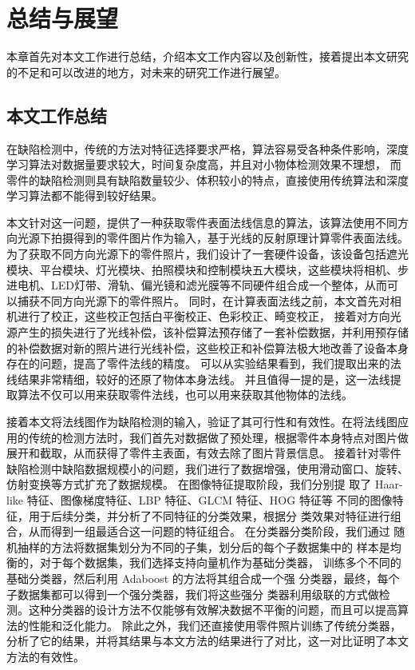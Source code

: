 
\chapter{总结与展望}

本章首先对本文工作进行总结，介绍本文工作内容以及创新性，接着提出本文研究的不足和可以改进的地方，对未来的研究工作进行展望。

\section{本文工作总结}

在缺陷检测中，传统的方法对特征选择要求严格，算法容易受各种条件影响，深度学习算法对数据量要求较大，时间复杂度高，并且对小物体检测效果不理想，
而零件的缺陷检测则具有缺陷数量较少、体积较小的特点，直接使用传统算法和深度学习算法都不能得到较好结果。

本文针对这一问题，提供了一种获取零件表面法线信息的算法，该算法使用不同方向光源下拍摄得到的零件图片作为输入，基于光线的反射原理计算零件表面法线。为了获取不同方向光源下的零件照片，我们设计了一套硬件设备，该设备包括遮光模块、平台模块、灯光模块、拍照模块和控制模块五大模块，这些模块将相机、步进电机、LED灯带、滑轨、偏光镜和滤光膜等不同硬件组合成一个整体，从而可以捕获不同方向光源下的零件照片。
同时，在计算表面法线之前，本文首先对相机进行了校正，这些校正包括白平衡校正、色彩校正、畸变校正，
接着对方向光源产生的损失进行了光线补偿，该补偿算法预存储了一套补偿数据，并利用预存储的补偿数据对新的照片进行光线补偿，这些校正和补偿算法极大地改善了设备本身存在的问题，提高了零件法线的精度。
可以从实验结果看到，我们提取出来的法线结果非常精细，较好的还原了物体本身法线。
并且值得一提的是，这一法线提取算法不仅可以用来获取零件法线，也可以用来获取其他物体的法线。

接着本文将法线图作为缺陷检测的输入，验证了其可行性和有效性。在将法线图应用的传统的检测方法时，我们首先对数据做了预处理，根据零件本身特点对图片做展开和截取，从而获得了零件主表面，有效去除了图片背景信息。
接着针对零件缺陷检测中缺陷数据规模小的问题，我们进行了数据增强，使用滑动窗口、旋转、仿射变换等方式扩充了数据规模。
在图像特征提取阶段，我们分别提
取了 Haar-like 特征、图像梯度特征、LBP 特征、GLCM 特征、HOG 特征等
不同的图像特征，用于后续分类，并分析了不同特征的分类效果，根据分
类效果对特征进行组合，从而得到一组最适合这一问题的特征组合。
在分类器分类阶段，我们通过
随机抽样的方法将数据集划分为不同的子集，划分后的每个子数据集中的
样本是均衡的，对于每个数据集，我们选择支持向量机作为基础分类器，
训练多个不同的基础分类器，然后利用 Adaboost 的方法将其组合成一个强
分类器，最终，每个子数据集都可以得到一个强分类器，我们将这些强分
类器利用级联的方式做检测。这种分类器的设计方法不仅能够有效解决数据不平衡的问题，而且可以提高算法的性能和泛化能力。
除此之外，我们还直接使用零件照片训练了传统分类器，分析了它的结果，并将其结果与本文方法的结果进行了对比，这一对比证明了本文方法的有效性。

